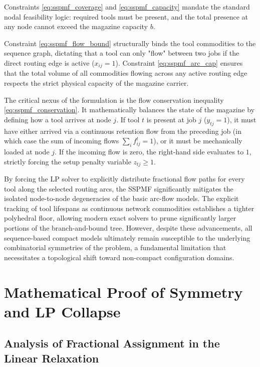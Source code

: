 \documentclass[11pt, a4paper]{book}
\begin{document}
	Constraints \eqref{eq:sspmf_coverage} and \eqref{eq:sspmf_capacity} mandate the standard nodal feasibility logic: required tools must be present, and the total presence at any node cannot exceed the magazine capacity $b$. 
	
	Constraint \eqref{eq:sspmf_flow_bound} structurally binds the tool commodities to the sequence graph, dictating that a tool can only "flow" between two jobs if the direct routing edge is active ($x_{ij}=1$). Constraint \eqref{eq:sspmf_arc_cap} ensures that the total volume of all commodities flowing across any active routing edge respects the strict physical capacity of the magazine carrier.
	
	The critical nexus of the formulation is the flow conservation inequality \eqref{eq:sspmf_conservation}. It mathematically balances the state of the magazine by defining how a tool arrives at node $j$. If tool $t$ is present at job $j$ ($y_{tj} = 1$), it must have either arrived via a continuous retention flow from the preceding job (in which case the sum of incoming flows $\sum_i f_{ij}^t = 1$), or it must be mechanically loaded at node $j$. If the incoming flow is zero, the right-hand side evaluates to $1$, strictly forcing the setup penalty variable $z_{tj} \ge 1$. 
	
	By forcing the LP solver to explicitly distribute fractional flow paths for every tool along the selected routing arcs, the SSPMF significantly mitigates the isolated node-to-node degeneracies of the basic arc-flow models. The explicit tracking of tool lifespans as continuous network commodities establishes a tighter polyhedral floor, allowing modern exact solvers to prune significantly larger portions of the branch-and-bound tree. However, despite these advancements, all sequence-based compact models ultimately remain susceptible to the underlying combinatorial symmetries of the problem, a fundamental limitation that necessitates a topological shift toward non-compact configuration domains.
	
	\section{Mathematical Proof of Symmetry and LP Collapse}
	
	\subsection{Analysis of Fractional Assignment in the Linear Relaxation}
	
\end{document}
